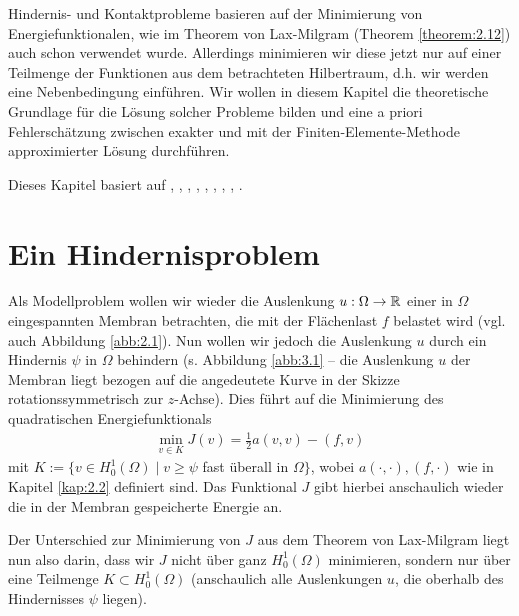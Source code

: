 \label{kap:3}

Hindernis- und Kontaktprobleme basieren auf der Minimierung von Energiefunktionalen, wie im Theorem von Lax-Milgram (Theorem \ref{theorem:2.12}) auch schon verwendet wurde. Allerdings minimieren wir diese jetzt nur auf einer Teilmenge der Funktionen aus dem betrachteten Hilbertraum, d.h. wir werden eine Nebenbedingung einführen. Wir wollen in diesem Kapitel die theoretische Grundlage für die Lösung solcher Probleme bilden und eine a priori Fehlerschätzung zwischen exakter und mit der Finiten-Elemente-Methode approximierter Lösung durchführen.

Dieses Kapitel basiert auf \cite{KikOden}, \cite{StarkeVar}, \cite{EPS}, \cite{EPSContact}, \cite{WriggersFEM}, \cite{WriggersContact}, \cite{HlaHas}, \cite{Glow}, \cite{Falk}.

\section{Ein Hindernisproblem}
\label{kap:3.1}


Als Modellproblem wollen wir wieder die Auslenkung $u:\Omega \rightarrow \mathbb{R}$ einer in $\Omega$ eingespannten Membran betrachten, die mit der Flächenlast $f$ belastet wird (vgl. auch Abbildung \ref{abb:2.1}). Nun wollen wir jedoch die Auslenkung $u$ durch ein Hindernis $\psi$ in $\Omega$ behindern (s. Abbildung \ref{abb:3.1} -- die Auslenkung $u$ der Membran liegt bezogen auf die angedeutete Kurve in der Skizze rotationssymmetrisch zur $z$-Achse). Dies führt auf die Minimierung des quadratischen Energiefunktionals
\begin{align}\label{eq:3.1}
\min_{v\in K} J(v) = \frac 1 2 a(v,v)-(f,v)
\end{align}
mit $K := \{v \in H^1_0(\Omega) \mid v\ge \psi$ fast überall in $\Omega\}$, wobei $a(\cdot,\cdot), (f,\cdot)$ wie in Kapitel \ref{kap:2.2} definiert sind. Das Funktional $J$ gibt hierbei anschaulich wieder die in der Membran gespeicherte Energie an.


Der Unterschied zur Minimierung von $J$ aus dem Theorem von Lax-Milgram liegt nun also darin, dass wir $J$ nicht über ganz $H^1_0(\Omega)$ minimieren, sondern nur über eine Teilmenge $K\subset H^1_0(\Omega)$ (anschaulich alle Auslenkungen $u$, die oberhalb des Hindernisses $\psi$ liegen).



